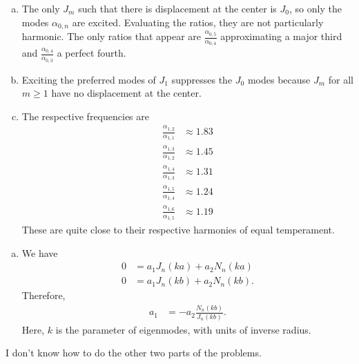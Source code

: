 \documentclass[10pt]{mypackage}
\begin{document}
\begin{solution}[41.25]\hfill
  \begin{enumerate}[(a)]
    \item The only $J_m$ such that there is displacement at the center is $J_0$, so only the modes $\alpha_{0,n}$ are excited. Evaluating the ratios, they are not particularly harmonic. The only ratios that appear are $\frac{\alpha_{0,5}}{\alpha_{0,4}}$ approximating a major third and $\frac{\alpha_{0,4}}{\alpha_{0,3}}$ a perfect fourth.
    \item Exciting the preferred modes of $J_{1}$ suppresses the $J_0$ modes because $J_{m}$ for all $m \geq 1$ have no displacement at the center.
    \item The respective frequencies are
      \begin{align*}
        \frac{\alpha_{1,2}}{\alpha_{1,1}} &\approx 1.83\\
        \frac{\alpha_{1,3}}{\alpha_{1,2}} &\approx 1.45\\
        \frac{\alpha_{1,4}}{\alpha_{1,3}} &\approx 1.31\\
        \frac{\alpha_{1,5}}{\alpha_{1,4}} &\approx 1.24\\
        \frac{\alpha_{1,6}}{\alpha_{1,5}} &\approx 1.19
      \end{align*}
      These are quite close to their respective harmonies of equal temperament.
  \end{enumerate}
\end{solution}
\begin{solution}[41.28]\hfill
  \begin{enumerate}[(a)]
    \item We have
      \begin{align*}
        0 &= a_1J_{n}\left( ka \right) + a_2N_n\left( ka \right)\\
        0 &= a_1J_n\left( kb \right) + a_2N_n\left( kb \right).
      \end{align*}
      Therefore,
      \begin{align*}
        a_1 &= -a_2\frac{N_n\left( kb \right)}{J_n\left( kb \right)}.
      \end{align*}
      Here, $k$ is the parameter of eigenmodes, with units of inverse radius.
  \end{enumerate}
  I don't know how to do the other two parts of the problems.
\end{solution}
\end{document}
